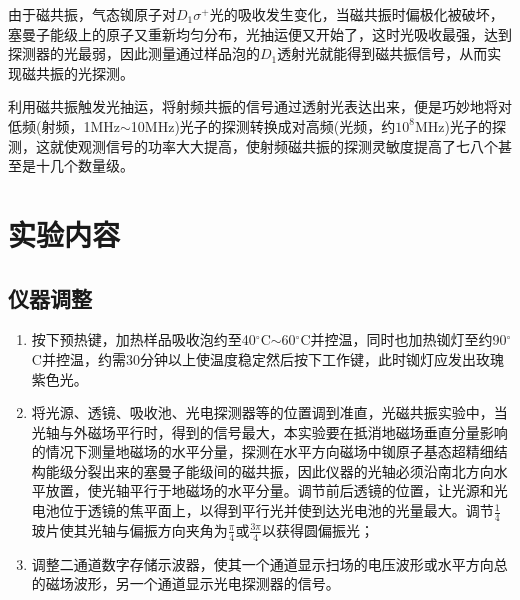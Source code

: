 \documentclass[a4paper]{article}
\begin{document}
由于磁共振，气态铷原子对$D_1\sigma^{+}$光的吸收发生变化，当磁共振时偏极化被破坏，塞曼子能级上的原子又重新均匀分布，光抽运便又开始了，这时光吸收最强，达到探测器的光最弱，因此测量通过样品泡的$D_1$透射光就能得到磁共振信号，从而实现磁共振的光探测。

利用磁共振触发光抽运，将射频共振的信号通过透射光表达出来，便是巧妙地将对低频(射频，1MHz$\sim$10MHz)光子的探测转换成对高频(光频，约$10^8$MHz)光子的探测，这就使观测信号的功率大大提高，使射频磁共振的探测灵敏度提高了七八个甚至是十几个数量级。

\section{实验内容}
\subsection{仪器调整}
\begin{enumerate}
\item 按下预热键，加热样品吸收泡约至40$^{\circ}$C$\sim$60$^{\circ}$C并控温，同时也加热铷灯至约90$^{\circ}$C并控温，约需30分钟以上使温度稳定然后按下工作键，此时铷灯应发出玫瑰紫色光。
\item 将光源、透镜、吸收池、光电探测器等的位置调到准直，光磁共振实验中，当光轴与外磁场平行时，得到的信号最大，本实验要在抵消地磁场垂直分量影响的情况下测量地磁场的水平分量，探测在水平方向磁场中铷原子基态超精细结构能级分裂出来的塞曼子能级间的磁共振，因此仪器的光轴必须沿南北方向水平放置，使光轴平行于地磁场的水平分量。调节前后透镜的位置，让光源和光电池位于透镜的焦平面上，以得到平行光并使到达光电池的光量最大。调节$\frac{1}{4}$玻片使其光轴与偏振方向夹角为$\frac{\pi}{4}$或$\frac{3\pi}{4}$以获得圆偏振光；
\item 调整二通道数字存储示波器，使其一个通道显示扫场的电压波形或水平方向总的磁场波形，另一个通道显示光电探测器的信号。
\end{enumerate}
\end{document}
